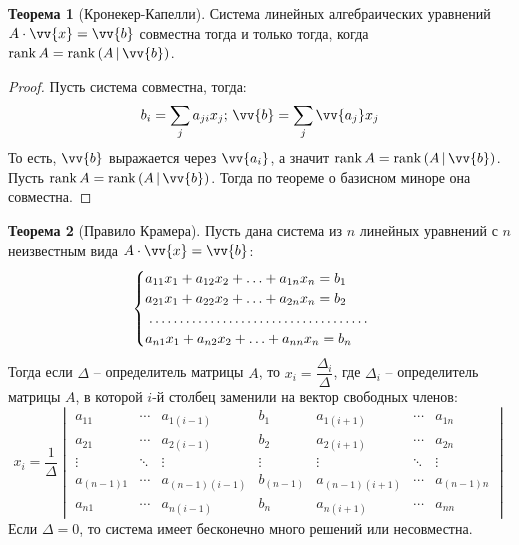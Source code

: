 \documentclass[12pt]{article}
\theoremstyle{definition}
\newtheorem{theorem}{Теорема}[section]
\begin{document}
\begin{theorem}[Кронекер-Капелли]
    Система линейных алгебраических уравнений $A\cdot \vv{x}=\vv{b}$ совместна тогда и только тогда, когда $\rank A=\rank\left(A\,|\,\vv{b}\right)$.
\end{theorem}
\begin{proof}
    Пусть система совместна, тогда:
    $$b_i=\sum_{j}a_{ji}x_j;\, \vv{b}=\sum_{j}\vv{a_j}x_j$$
    То есть, $\vv{b}$ выражается через $\vv{a_i}$, а значит $\rank A=\rank\left(A\,|\,\vv{b}\right)$.
    Пусть $\rank A=\rank\left(A\,|\,\vv{b}\right)$. Тогда по теореме о базисном миноре она совместна.
\end{proof}
\begin{theorem}[Правило Крамера]
    Пусть дана система из $n$ линейных уравнений с $n$ неизвестным вида $A\cdot \vv{x}=\vv{b}$:
    $$\begin{cases}
        a_{11}x_1 + a_{12}x_2 + \ldots + a_{1n}x_n = b_1\\
        a_{21}x_1 + a_{22}x_2 + \ldots + a_{2n}x_n = b_2\\
        \makebox[57mm]{\dotfill}\\
        a_{n1}x_1 + a_{n2}x_2 + \ldots + a_{nn}x_n = b_n
    \end{cases}$$
    Тогда если $\Delta$ – определитель матрицы $A$, то $x_i=\dfrac{\Delta_i}{\Delta}$, где $\Delta_i$ – определитель матрицы $A$, в которой $i$-й столбец заменили на вектор свободных членов:
    $$x_i=\frac{1}{\Delta}\begin{vmatrix}
        a_{11} & \cdots & a_{1(i-1)} & b_1 & a_{1(i+1)} & \cdots & a_{1n}\\
        a_{21} & \cdots & a_{2(i-1)} & b_2 & a_{2(i+1)} & \cdots & a_{2n}\\
        \vdots & \ddots & \vdots & \vdots & \vdots & \ddots & \vdots\\
        a_{(n-1)1} & \cdots & a_{(n-1)(i-1)} & b_{(n-1)} & a_{(n-1)(i+1)} & \cdots & a_{(n-1)n}\\
        a_{n1} & \cdots & a_{n(i-1)} & b_n & a_{n(i+1)} & \cdots & a_{nn}
    \end{vmatrix}$$
    Если $\Delta=0$, то система имеет бесконечно много решений или несовместна.
\end{theorem}
\end{document}
